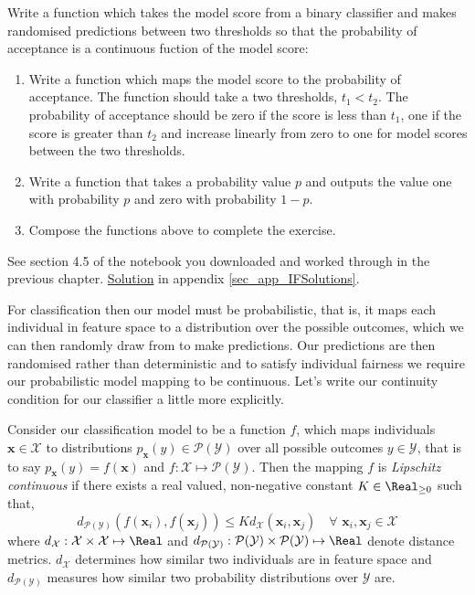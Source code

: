\begin{lookbox}
Write a function which takes the model score from a binary classifier and makes randomised predictions between two thresholds so that the probability of acceptance is a continuous fuction of the model score:
\begin{enumerate}[leftmargin=*]
\item Write a function which maps the model score to the probability of acceptance. The function should take a two thresholds, $t_1<t_2$. The probability of acceptance should be zero if the score is less than $t_1$, one if the score is greater than $t_2$ and increase linearly from zero to one for model scores between the two thresholds.
\item Write a function that takes a probability value $p$ and outputs the value one with probability $p$ and zero with probability $1-p$.
\item Compose the functions above to complete the exercise.
\end{enumerate}
See section 4.5 of the notebook you downloaded and worked through in the previous chapter. \hyperlink{IF_RandPreds}{Solution} in appendix \ref{sec_app_IFSolutions}.
\end{lookbox}

For classification then our model must be probabilistic, that is, it maps each individual in feature space to a distribution over the possible outcomes, which we can then randomly draw from to make predictions. Our predictions are then randomised rather than deterministic and to satisfy individual fairness we require our probabilistic model mapping to be continuous. Let's write our continuity condition for our classifier a little more explicitly.

\begin{lookbox}
Consider our classification model to be a function $f$, which maps individuals $\boldsymbol{x}\in\mathcal{X}$ to distributions $p_{\boldsymbol{x}}(y) \in \mathcal{P}(\mathcal{Y})$ over all possible outcomes $y\in\mathcal{Y}$, that is to say $p_{\boldsymbol{x}}(y)=f(\boldsymbol{x})$ and  $f:\mathcal{X}\mapsto\mathcal{P}(\mathcal{Y})$. Then the mapping $f$ is \emph{Lipschitz continuous} if there exists a real valued, non-negative constant $K \in \Real_{\geq 0}$ such that,
\begin{equation} \label{eq:LipContClf}
d_{\mathcal{P}(\mathcal{Y})}(f(\boldsymbol{x}_i), f(\boldsymbol{x}_j)) \leq K d_{\mathcal{X}}(\boldsymbol{x}_i, \boldsymbol{x}_j) \quad
\forall\,\, \boldsymbol{x}_i, \boldsymbol{x}_j \in \mathcal{X}
\end{equation}
where $d_{\mathcal{X}}:\mathcal{X}\times\mathcal{X}\mapsto\Real$ and $d_{\mathcal{P}(\mathcal{Y})}:\mathcal{P}(\mathcal{Y})\times\mathcal{P}(\mathcal{Y})\mapsto\Real$  denote distance metrics. $d_{\mathcal{X}}$ determines how similar two individuals are in feature space and $d_{\mathcal{P}(\mathcal{Y})}$ measures how similar two probability distributions over $\mathcal{Y}$ are.
\end{lookbox}

